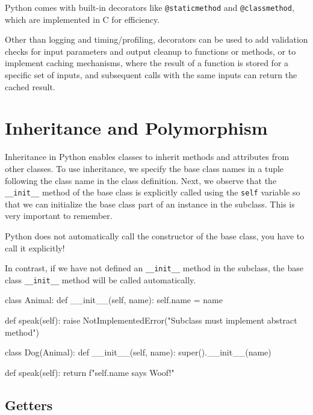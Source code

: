 \begin{observationblock}
    Python comes with built-in decorators like \texttt{@staticmethod} and \texttt{@classmethod}, which are
    implemented in C for efficiency.
\end{observationblock}

Other than logging and timing/profiling, decorators can be used to add validation checks for
input parameters and output cleanup to functions or methods, or to implement caching
mechanisms, where the result of a function is stored for a specific set of inputs, and subsequent
calls with the same inputs can return the cached result.


\section{Inheritance and Polymorphism}

Inheritance in Python enables classes to inherit methods and attributes from other classes.
To use inheritance, we specify the base class names in a tuple following the class name in the
class definition. Next, we observe that the \texttt{\_\_init\_\_} method of the base class is explicitly called using the \texttt{self}
variable so that we can initialize the base class part of an instance in the subclass. This is very
important to remember.

\begin{warningblock}
    Python does not automatically call the constructor of the base class, you have to call it explicitly!
\end{warningblock}

In contrast, if we have not defined an \texttt{\_\_init\_\_} method in the subclass, the base class \texttt{\_\_init\_\_} method will be called automatically.

\begin{codeblock}[language=Python]
class Animal:
    def __init__(self, name):
        self.name = name

    def speak(self):
        raise NotImplementedError("Subclass must implement abstract method")

class Dog(Animal):
    def __init__(self, name):
        super().__init__(name)

    def speak(self):
        return f"{self.name} says Woof!"
\end{codeblock}

\subsection*{Getters}

